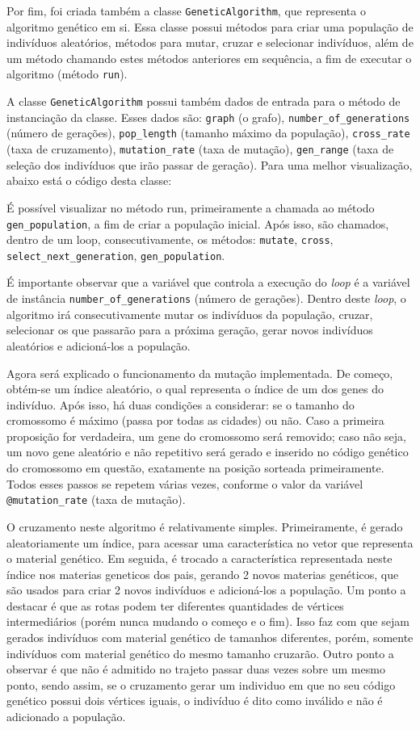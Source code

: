 Por fim, foi criada também a classe \texttt{GeneticAlgorithm}, que representa o algoritmo genético em si. Essa classe possui métodos para criar uma população de indivíduos aleatórios, métodos para mutar, cruzar e selecionar indivíduos, além de um método chamando estes métodos anteriores em sequência, a fim de executar o algoritmo (método \texttt{run}).


A classe \texttt{GeneticAlgorithm} possui também dados de entrada para o método de instanciação da classe. Esses dados são: \texttt{graph} (o grafo), \texttt{number\_of\_generations} (número de gerações), \texttt{pop\_length} (tamanho máximo da população), \texttt{cross\_rate} (taxa de cruzamento), \texttt{mutation\_rate} (taxa de mutação), \texttt{gen\_range} (taxa de seleção dos indivíduos que irão passar de geração).
Para uma melhor visualização, abaixo está o código desta classe:



É possível visualizar no método run, primeiramente a chamada ao método \texttt{gen\_population}, a fim de criar a população inicial. Após isso, são chamados, dentro de um loop, consecutivamente, os métodos: \texttt{mutate}, \texttt{cross}, \texttt{select\_next\_generation}, \texttt{gen\_population}.

É importante observar que a variável que controla a execução do \emph{loop} é a variável de instância \texttt{number\_of\_generations} (número de gerações). Dentro deste \emph{loop}, o algoritmo irá consecutivamente mutar os indivíduos da população, cruzar, selecionar os que passarão para a próxima geração, gerar novos indivíduos aleatórios e adicioná-los a população.

Agora será explicado o funcionamento da mutação implementada. De começo, obtém-se um índice aleatório, o qual representa o índice de um dos genes do indivíduo. Após isso, há duas condições a considerar: se o tamanho do cromossomo é máximo (passa por todas as cidades) ou não. Caso a primeira proposição for verdadeira, um gene do cromossomo será removido; caso não seja, um novo gene aleatório e não repetitivo será gerado e inserido no código genético do cromossomo em questão, exatamente na posição sorteada primeiramente. Todos esses passos se repetem várias vezes, conforme o valor da variável \texttt{@mutation\_rate} (taxa de mutação).

O cruzamento neste algoritmo é relativamente simples. Primeiramente, é gerado aleatoriamente um índice, para acessar uma característica no vetor que representa o material genético. Em seguida, é trocado a característica representada neste índice nos materias geneticos dos pais, gerando 2 novos materias genéticos, que são usados para criar 2 novos indivíduos e adicioná-los a população. Um ponto a destacar é que as rotas podem ter diferentes quantidades de vértices intermediários (porém nunca mudando o começo e o fim). Isso faz com que sejam gerados indivíduos com material genético de tamanhos diferentes, porém, somente indivíduos com material genético do mesmo tamanho cruzarão. 
Outro ponto a observar é que não é admitido no trajeto passar duas vezes sobre um mesmo ponto, sendo assim, se o cruzamento gerar um individuo em que no seu código genético possui dois vértices iguais, o indivíduo é dito como inválido e não é adicionado a população.
